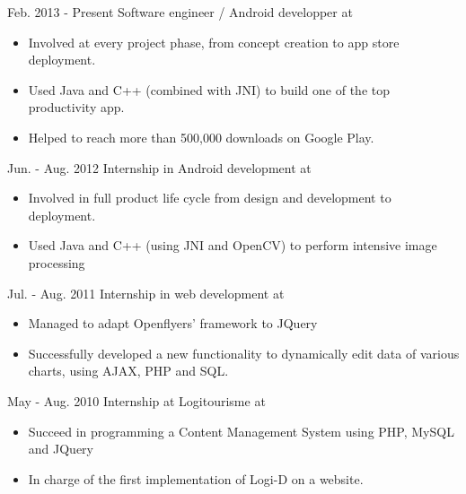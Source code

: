 \cventry
{Feb. 2013 - Present}
{Software engineer / Android developper }
{at }
{}
{}
{
	\begin{itemize}
		\item Involved at every project phase, from concept creation to app store deployment.
		\item Used Java and C++ (combined with JNI) to build one of the top productivity app.
		\item Helped to reach more than 500,000 downloads on Google Play.
	\end{itemize}
}

\cventry
{Jun. - Aug. 2012}
{Internship in Android development}
{at }
{}
{}
{
	\begin{itemize}
		\item Involved in full product life cycle from design and development to deployment.
		\item Used Java and C++ (using JNI and OpenCV) to perform intensive image processing
	\end{itemize}
}

\cventry
{Jul. - Aug. 2011}
{Internship in web development}
{at }
{}
{}
{
	\begin{itemize}
		\item Managed to adapt Openflyers' framework to JQuery
		\item Successfully developed a new functionality to dynamically edit data of various charts, using AJAX, PHP and SQL.
	\end{itemize}
}

\cventry
{May - Aug. 2010}
{Internship at Logitourisme}
{at }
{}
{}
{
	\begin{itemize}
		\item Succeed in programming a Content Management System using PHP, MySQL and JQuery
		\item In charge of the first implementation of Logi-D on a website. 
	\end{itemize}
}